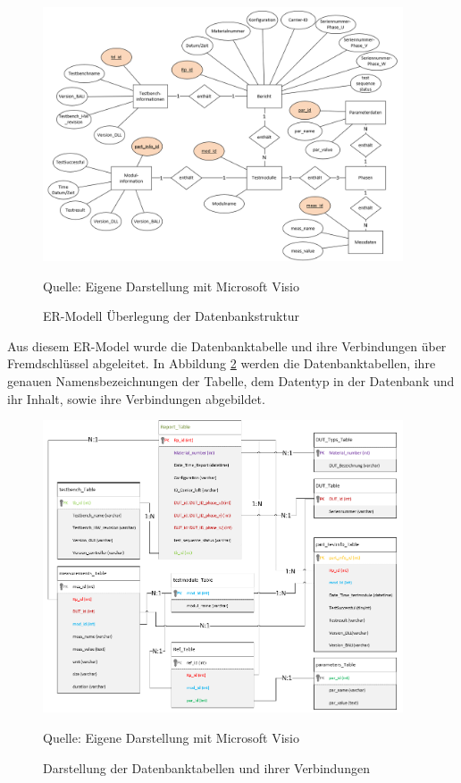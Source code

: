 \begin{figure}[H]
    \centering
    \includegraphics[width=0.95\textwidth]{Grafiken/Bild von ER-Modell}
    \caption{ER-Modell Überlegung der Datenbankstruktur}
    \label{fig: ER-Modell Überlegung der Datenbankstruktur}
    {Quelle: Eigene Darstellung mit Microsoft Visio}
\end{figure}

Aus diesem ER-Model wurde die Datenbanktabelle und ihre Verbindungen über Fremdschlüssel abgeleitet. In Abbildung \ref{fig: Darstellung der Datenbanktabellen und ihrer Verbindungen}
werden die Datenbanktabellen, ihre genauen Namensbezeichnungen der Tabelle, dem Datentyp in der Datenbank und ihr Inhalt, sowie ihre Verbindungen abgebildet.

\begin{figure}[H]
    \centering
    \includegraphics[width=0.95\textwidth]{Grafiken/Tabellendiagramm Datenbank}
    \caption{Darstellung der Datenbanktabellen und ihrer Verbindungen}
    \label{fig: Darstellung der Datenbanktabellen und ihrer Verbindungen}
    {Quelle: Eigene Darstellung mit Microsoft Visio}
\end{figure}






